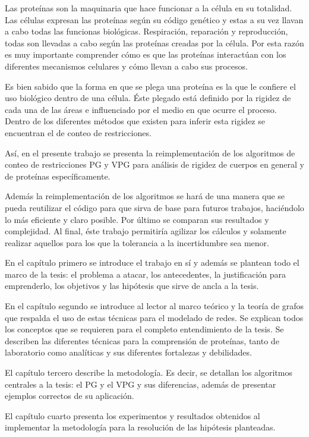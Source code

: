Las proteínas son la maquinaria que hace funcionar a la célula en su totalidad. Las células expresan las proteínas según su código genético y estas a su vez llavan a cabo todas las funcionas biológicas. Respiración, reparación y reproducción, todas son llevadas a cabo según las proteínas creadas por la célula. Por esta razón es muy importante comprender cómo es que las proteínas interactúan con los diferentes mecanismos celulares y cómo llevan a cabo sus procesos.

Es bien sabido que la forma en que se plega una proteína es la que le confiere el uso biológico dentro de una célula. Éste plegado está definido por la rigidez de cada una de las áreas e influenciado por el medio en que ocurre el proceso. Dentro de los diferentes métodos que existen para inferir esta rigidez se encuentran el de conteo de restricciones.

Así, en el presente trabajo se presenta la reimplementación de los algoritmos de conteo de restricciones PG y VPG para análisis de rigidez de cuerpos en general y de proteínas específicamente. 

Además la reimplementación de los algoritmos se hará de una manera que se pueda reutilizar el código para que sirva de base para futuros trabajos, haciéndolo lo más eficiente y claro posible. Por último se comparan sus resultados y complejidad. Al final, éste trabajo permitiría agilizar los cálculos y solamente realizar aquellos para los que la tolerancia a la incertidumbre sea menor.

En el capítulo primero se introduce el trabajo en sí y además se plantean todo el marco de la tesis: el problema a atacar, los antecedentes, la justificación para emprenderlo, los objetivos y las hipótesis que sirve de ancla a la tesis.

En el capítulo segundo se introduce al lector al marco teórico y la teoría de grafos que respalda el uso de estas técnicas para el modelado de redes. Se explican todos los conceptos que se requieren para el completo entendimiento de la tesis. Se describen las diferentes técnicas para la comprensión de proteínas, tanto de laboratorio como analíticas y sus diferentes fortalezas y debilidades.

El capítulo tercero describe la metodología. Es decir, se detallan los algoritmos centrales a la tesis: el PG y el VPG y sus diferencias, además de presentar ejemplos correctos de su aplicación.

El capítulo cuarto presenta los experimentos y resultados obtenidos al implementar la metodología para la resolución de las hipótesis planteadas.


